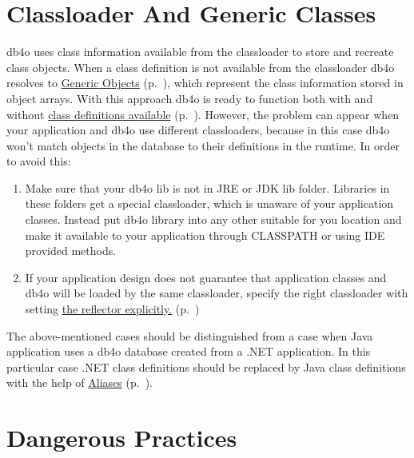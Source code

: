 \section{Classloader And Generic Classes}
\label{ref:usage-pitfalls-classloader-and-generic-classes}

db4o uses class information available from the classloader to store and recreate class objects. When a class definition is not available from the classloader db4o resolves to \hyperref[ref:advanced-topics-db4o-reflection-api-genericreflector]{Generic Objects} (p.~\pageref{ref:advanced-topics-db4o-reflection-api-genericreflector}), which represent the class information stored in object arrays. With this approach db4o is ready to function both with and without \hyperref[ref:client-server-server-without-persistent-classes-deployed]{class definitions available} (p.~\pageref{ref:client-server-server-without-persistent-classes-deployed}). However, the problem can appear when your application and db4o use different classloaders, because in this case db4o won't match objects in the database to their definitions in the runtime. In order to avoid this:

\begin{enumerate}
\item Make sure that your db4o lib is not in JRE or JDK lib folder. Libraries in these folders get a special classloader, which is unaware of your application classes. Instead put db4o library into any other suitable for you location and make it available to your application through CLASSPATH or using IDE provided methods.
\item If your application design does not guarantee that application classes and db4o will be loaded by the same classloader, specify the right classloader with setting \hyperref[ref:configuration-common-reflector]{the reflector explicitly.} (p.~\pageref{ref:configuration-common-reflector})
\end{enumerate}

The above-mentioned cases should be distinguished from a case when Java application uses a db4o database created from a .NET application. In this particular case .NET class definitions should be replaced by Java class definitions with the help of \hyperref[ref:configuration-common-alias]{Aliases} (p.~\pageref{ref:configuration-common-alias}).

\section{Dangerous Practices}
\label{ref:usage-pitfalls-dangerous-practices}

